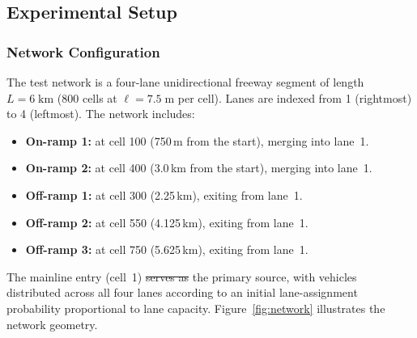 \documentclass[review,authoryear]{elsarticle}
\providecommand{\DIFaddtex}[1]{{\protect\color{blue}\uwave{#1}}} %
\providecommand{\DIFdeltex}[1]{{\protect\color{red}\sout{#1}}}                      %
\providecommand{\DIFaddbegin}{} %
\providecommand{\DIFaddend}{} %
\providecommand{\DIFdelbegin}{} %
\providecommand{\DIFdelend}{} %
\providecommand{\DIFadd}[1]{\texorpdfstring{\DIFaddtex{#1}}{#1}} %
\providecommand{\DIFdel}[1]{\texorpdfstring{\DIFdeltex{#1}}{}} %
\newcommand{\DIFscaledelfig}{0.5}
\newlength{\DIFdelgraphicswidth} %
\newlength{\DIFdelgraphicsheight} %
\newcommand{\DIFaddincludegraphics}[2][]{{\color{blue}\fbox{\DIFOincludegraphics[#1]{#2}}}} %
\newcommand{\DIFdelincludegraphics}[2][]{%
\sbox{\DIFdelgraphicsbox}{\DIFOincludegraphics[#1]{#2}}%
\settoboxwidth{\DIFdelgraphicswidth}{\DIFdelgraphicsbox} %
\settoboxtotalheight{\DIFdelgraphicsheight}{\DIFdelgraphicsbox} %
\scalebox{\DIFscaledelfig}{%
\parbox[b]{\DIFdelgraphicswidth}{\usebox{\DIFdelgraphicsbox}\\[-\baselineskip] \rule{\DIFdelgraphicswidth}{0em}}\llap{\resizebox{\DIFdelgraphicswidth}{\DIFdelgraphicsheight}{%
\setlength{\unitlength}{\DIFdelgraphicswidth}%
\begin{picture}(1,1)%
\thicklines\linethickness{2pt} %
{\color[rgb]{1,0,0}\put(0,0){\framebox(1,1){}}}%
{\color[rgb]{1,0,0}\put(0,0){\line( 1,1){1}}}%
{\color[rgb]{1,0,0}\put(0,1){\line(1,-1){1}}}%
\end{picture}%
}\hspace*{3pt}}} %
} %
\DeclareRobustCommand{\DIFaddbegin}{\DIFOaddbegin \let\includegraphics\DIFaddincludegraphics} %
\DeclareRobustCommand{\DIFaddend}{\DIFOaddend \let\includegraphics\DIFOincludegraphics} %
\DeclareRobustCommand{\DIFdelbegin}{\DIFOdelbegin \let\includegraphics\DIFdelincludegraphics} %
\DeclareRobustCommand{\DIFdelend}{\DIFOaddend \let\includegraphics\DIFOincludegraphics} %
\begin{document}
\subsection{Experimental Setup}
\label{sec:exp_setup}

\subsubsection{Network Configuration}

The test network is a four-lane unidirectional freeway segment of length $L = 6\;\text{km}$ (800 cells at $\ell = 7.5\;\text{m}$ per cell). Lanes are indexed from 1 (rightmost) to 4 (leftmost). The network includes:
\begin{itemize}
    \item \textbf{On-ramp 1:} at cell 100 (750\,m from the start), merging into lane~1.
    \item \textbf{On-ramp 2:} at cell 400 (3.0\,km from the start), merging into lane~1.
    \item \textbf{Off-ramp 1:} at cell 300 (2.25\,km), exiting from lane~1.
    \item \textbf{Off-ramp 2:} at cell 550 (4.125\,km), exiting from lane~1.
    \item \textbf{Off-ramp 3:} at cell 750 (5.625\,km), exiting from lane~1.
\end{itemize}

The mainline entry (cell~1) \DIFdelbegin \DIFdel{serves as }\DIFdelend \DIFaddbegin \DIFadd{is }\DIFaddend the primary source, with vehicles distributed across all four lanes according to an initial lane-assignment probability proportional to lane capacity. Figure~\ref{fig:network} illustrates the network geometry.
\end{document}

